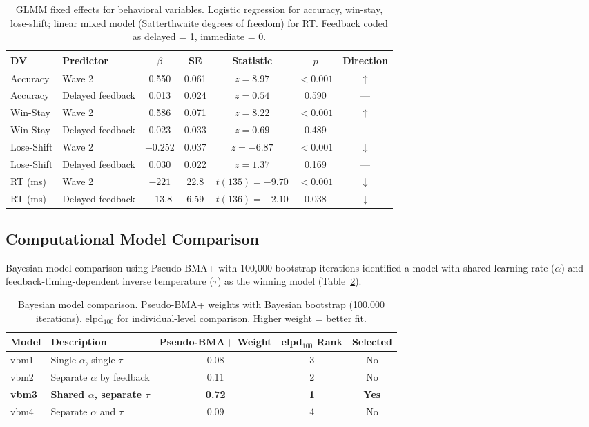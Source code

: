 \documentclass[11pt]{article}
\begin{document}
\begin{table}[H]
\centering
\caption{GLMM fixed effects for behavioral variables. Logistic regression for accuracy, win-stay, lose-shift; linear mixed model (Satterthwaite degrees of freedom) for RT. Feedback coded as delayed = 1, immediate = 0.}
\label{tab:glmm}
\begin{tabular}{llccccc}
\toprule
\textbf{DV} & \textbf{Predictor} & \textbf{$\beta$} & \textbf{SE} & \textbf{Statistic} & \textbf{$p$} & \textbf{Direction} \\
\midrule
Accuracy & Wave 2 & 0.550 & 0.061 & $z = 8.97$ & $< 0.001$ & $\uparrow$ \\
Accuracy & Delayed feedback & 0.013 & 0.024 & $z = 0.54$ & 0.590 & --- \\
Win-Stay & Wave 2 & 0.586 & 0.071 & $z = 8.22$ & $< 0.001$ & $\uparrow$ \\
Win-Stay & Delayed feedback & 0.023 & 0.033 & $z = 0.69$ & 0.489 & --- \\
Lose-Shift & Wave 2 & $-0.252$ & 0.037 & $z = -6.87$ & $< 0.001$ & $\downarrow$ \\
Lose-Shift & Delayed feedback & 0.030 & 0.022 & $z = 1.37$ & 0.169 & --- \\
RT (ms) & Wave 2 & $-221$ & 22.8 & $t(135) = -9.70$ & $< 0.001$ & $\downarrow$ \\
RT (ms) & Delayed feedback & $-13.8$ & 6.59 & $t(136) = -2.10$ & 0.038 & $\downarrow$ \\
\bottomrule
\end{tabular}
\end{table}

\subsection{Computational Model Comparison}

Bayesian model comparison using Pseudo-BMA+ with 100,000 bootstrap iterations identified a model with shared learning rate ($\alpha$) and feedback-timing-dependent inverse temperature ($\tau$) as the winning model (Table~\ref{tab:model_comparison}).

\begin{table}[H]
\centering
\caption{Bayesian model comparison. Pseudo-BMA+ weights with Bayesian bootstrap (100,000 iterations). elpd$_{100}$ for individual-level comparison. Higher weight = better fit.}
\label{tab:model_comparison}
\begin{tabular}{llccc}
\toprule
\textbf{Model} & \textbf{Description} & \textbf{Pseudo-BMA+ Weight} & \textbf{elpd$_{100}$ Rank} & \textbf{Selected} \\
\midrule
vbm1 & Single $\alpha$, single $\tau$ & 0.08 & 3 & No \\
vbm2 & Separate $\alpha$ by feedback & 0.11 & 2 & No \\
\textbf{vbm3} & \textbf{Shared $\alpha$, separate $\tau$} & \textbf{0.72} & \textbf{1} & \textbf{Yes} \\
vbm4 & Separate $\alpha$ and $\tau$ & 0.09 & 4 & No \\
\bottomrule
\end{tabular}
\end{table}
\end{document}

